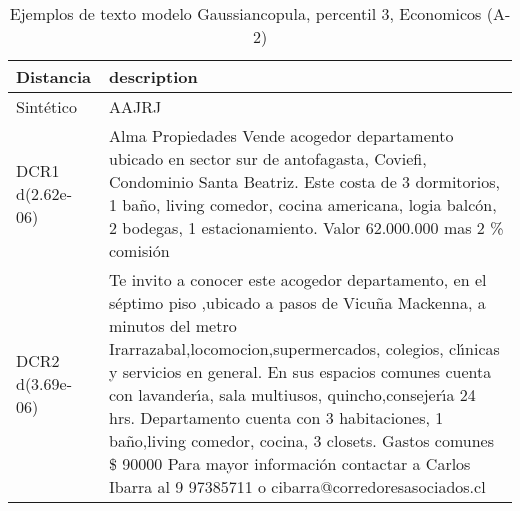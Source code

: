 \begin{table}[H]
\centering
\fontsize{10}{14}\selectfont
\caption{Ejemplos de texto modelo Gaussiancopula, percentil 3, Economicos (A-2)}
\label{table-example-economicos-a-2-gaussiancopula-3p-text}
\begin{tabular}{|l|m{35em}|}
\hline
\rowcolor[gray]{0.8}
Distancia & description \\
\hline Sintético & AAJRJ \\
\hline DCR1 d(2.62e-06) & Alma Propiedades Vende acogedor departamento ubicado en sector sur de antofagasta, Coviefi, Condominio Santa Beatriz. Este costa de 3 dormitorios, 1 ba\~no, living comedor, cocina americana, logia balc\'on, 2 bodegas, 1 estacionamiento. Valor 62.000.000 mas 2 \% comisi\'on \\
\hline DCR2 d(3.69e-06) & Te invito a conocer este acogedor departamento, en el s\'eptimo piso ,ubicado a pasos de Vicu\~na Mackenna, a minutos del metro Irarrazabal,locomocion,supermercados, colegios, cl{\'\i}nicas y servicios en general.
 En sus espacios comunes cuenta con lavander{\'\i}a, sala multiusos, quincho,consejer{\'\i}a 24 hrs. Departamento cuenta con 3 habitaciones, 1 ba\~no,living comedor, cocina, 3 closets.
 Gastos comunes \$ 90000 Para mayor informaci\'on contactar a Carlos Ibarra al 9 97385711 o cibarra@corredoresasociados.cl \\
\hline
\end{tabular}
\end{table}
